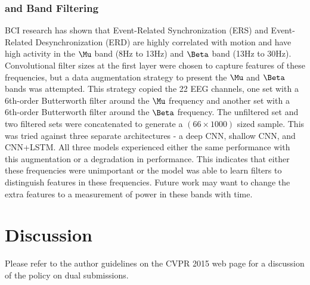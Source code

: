 \documentclass[10pt,twocolumn,letterpaper]{article}
\begin{document}
\subsubsection{\Mu and \Beta Band Filtering}


BCI research has shown that Event-Related Synchronization (ERS) and
Event-Related Desynchronization (ERD) are highly correlated with motion and have
high activity in the $\Mu$ band (8Hz to 13Hz) and $\Beta$ band (13Hz to 30Hz).
Convolutional filter sizes at the first layer were chosen to capture features of
these frequencies, but a data augmentation strategy to present the $\Mu$ and
$\Beta$ bands was attempted. This strategy copied the 22 EEG channels, one set
with a 6th-order Butterworth filter around the $\Mu$ frequency and another set
with a 6th-order Butterworth filter around the $\Beta$ frequency. The unfiltered
set and two filtered sets were concatenated to generate a $(66 \times 1000)$
sized sample. This was tried against three separate architectures - a deep CNN,
shallow CNN, and CNN+LSTM. All three models experienced either the same
performance with this augmentation or a degradation in performance. This
indicates that either these frequencies were unimportant or the model was
able to learn filters to distinguish features in these frequencies. Future work
may want to change the extra features to a measurement of power in these bands
with time.


\section{Discussion}

Please refer to the author guidelines on the CVPR 2015 web page for a
discussion of the policy on dual submissions.
\end{document}
